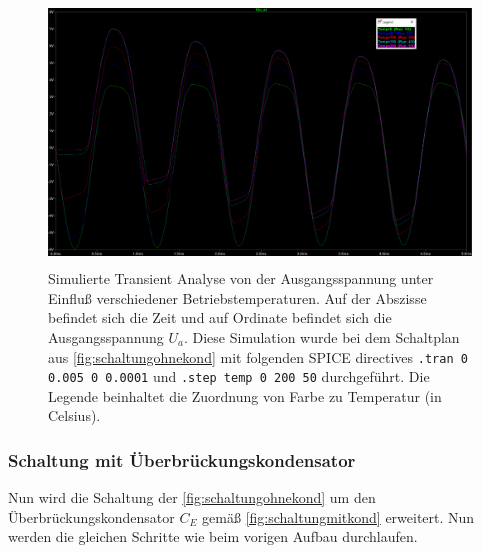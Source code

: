\documentclass[12pt,english,ngerman]{scrartcl}
\begin{document}
\begin{figure}[H]
  \centering
    \includegraphics[width=\linewidth, height=7cm]{./figures/ohnekond/tempsweepausgang.png }
    \caption[Simulierte Transient Analyse ohne
    Überbrückungskondensator]{Simulierte Transient Analyse von der
      Ausgangsspannung unter Einfluß verschiedener Betriebstemperaturen. Auf
      der Abszisse befindet sich die Zeit und auf Ordinate befindet sich die
      Ausgangsspannung $U_a$. Diese Simulation wurde bei dem Schaltplan aus
    \autoref{fig:schaltungohnekond} mit folgenden SPICE directives \texttt{.tran
      0 0.005 0 0.0001} und \texttt{.step temp 0 200 50} durchgeführt. Die Legende
    beinhaltet die Zuordnung von Farbe zu Temperatur (in Celsius).}
  \label{fig:sim_tran_temp_ohne}
\end{figure}


\subsubsection{Schaltung mit Überbrückungskondensator} \label{sec:Schaltung mit Überbückungskondensator}

Nun wird die Schaltung der  \autoref{fig:schaltungohnekond} um den
Überbrückungskondensator $C_E$ gemäß  \autoref{fig:schaltungmitkond}
erweitert. Nun werden die gleichen Schritte wie beim vorigen Aufbau
durchlaufen.
\end{document}
